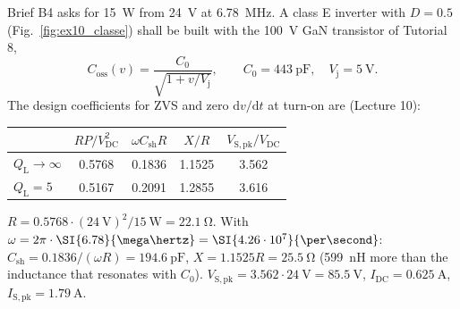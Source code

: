 


Brief B4 asks for \SI{15}{\watt} from \SI{24}{\volt} at \SI{6.78}{\mega\hertz}. A class E inverter with $D=0.5$ (Fig.~\ref{fig:ex10_classe}) shall be built with the \SI{100}{\volt} GaN transistor of Tutorial 8,
\begin{equation}
	C_\mathrm{oss}(v)=\frac{C_0}{\sqrt{1+v/V_\mathrm{j}}},\qquad C_0=\SI{443}{\pico\farad},\quad V_\mathrm{j}=\SI{5}{\volt}.
\end{equation}
The design coefficients for ZVS and zero $\mathrm{d}v/\mathrm{d}t$ at turn-on are (Lecture 10):

\begin{center}
	\begin{tabular}{|l|c|c|c|c|}
		\hline
		                        & $RP/V_\mathrm{DC}^2$ & $\omega C_\mathrm{sh}R$ & $X/R$  & $V_\mathrm{S,pk}/V_\mathrm{DC}$ \\
		\hline
		$Q_\mathrm{L}\to\infty$ & 0.5768               & 0.1836                  & 1.1525 & 3.562                           \\
		$Q_\mathrm{L}=5$        & 0.5167               & 0.2091                  & 1.2855 & 3.616                           \\
		\hline
	\end{tabular}
	\label{tab:ex10_coeff}
\end{center}




\begin{solutionblock}
	$R=0.5768\cdot(\SI{24}{\volt})^2/\SI{15}{\watt}=\SI{22.1}{\ohm}$. With $\omega=2\pi\cdot\SI{6.78}{\mega\hertz}=\SI{4.26\cdot10^{7}}{\per\second}$: $C_\mathrm{sh}=0.1836/(\omega R)=\SI{194.6}{\pico\farad}$, $X=1.1525R=\SI{25.5}{\ohm}$ (\SI{599}{\nano\henry} more than the inductance that resonates with $C_0$). $V_\mathrm{S,pk}=3.562\cdot\SI{24}{\volt}=\SI{85.5}{\volt}$, $I_\mathrm{DC}=\SI{0.625}{\ampere}$, $I_\mathrm{S,pk}=\SI{1.79}{\ampere}$.
\end{solutionblock}

